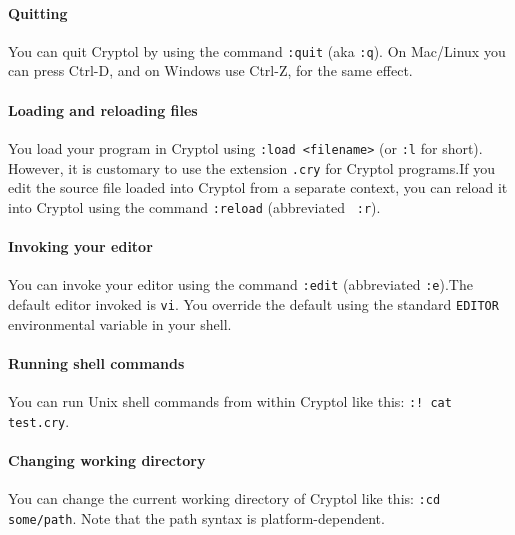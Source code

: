 
\paragraph*{Quitting}
You can quit Cryptol by using the command {\tt :quit} (aka
\texttt{:q}).  On Mac/Linux you can press Ctrl-D, and on Windows use
Ctrl-Z, for the same effect.\indCmdQuit

\paragraph*{Loading and reloading files}
You load your program in Cryptol using {\tt :load <filename>} (or
\texttt{:l} for short).  However, it is customary to use the extension
{\tt .cry} for Cryptol programs.\indCmdLoad If you edit the source
file loaded into Cryptol from a separate context, you can reload it
into Cryptol using the command {\tt :reload} (abbreviated {\tt
  :r}).\indCmdReload

\paragraph*{Invoking your editor}
You can invoke your editor using the command {\tt :edit} (abbreviated
\texttt{:e}).\indCmdEdit The default editor invoked is
\texttt{vi}.  You override the default using the standard
\texttt{EDITOR} environmental variable in your shell.\indSettingEditor


\paragraph*{Running shell commands}
You can run Unix shell commands from within Cryptol like this: {\tt :!
  cat test.cry}.\indCmdShell

\paragraph*{Changing working directory}
You can change the current working directory of Cryptol like this:
\texttt{:cd some/path}.  Note that the path syntax is
platform-dependent.

